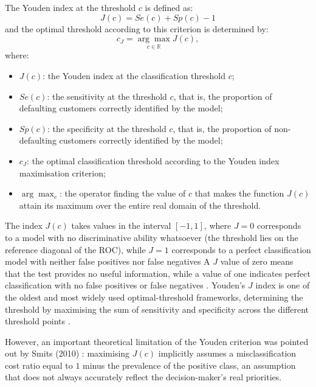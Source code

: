 \begin{enumerate}[label=\alph*)]
    \vspace{1em}
    \hspace{0.5cm} The Youden index at the threshold $c$ is defined as:
    \begin{equation}
        J(c) = Se(c) + Sp(c) - 1
    \end{equation}
    and the optimal threshold according to this criterion is determined by:
    \begin{equation}
        c_J = \underset{c \in \mathbb{R}}{\arg\max} J(c),
    \end{equation}
    where:
    \begin{itemize}
        \item $J(c)$: the Youden index at the classification threshold $c$;
        \item $Se(c)$: the sensitivity at the threshold $c$, that is, the proportion of defaulting customers correctly identified by the model;
        \item $Sp(c)$: the specificity at the threshold $c$, that is, the proportion of non-defaulting customers correctly identified by the model;
        \item $c_J$: the optimal classification threshold according to the Youden index maximisation criterion;
        \item $\arg\max_{c}$: the operator finding the value of $c$ that makes the function $J(c)$ attain its maximum over the entire real domain of the threshold.
    \end{itemize}
        \vspace{1em}
        \hspace{0.5cm} The index $J(c)$ takes values in the interval $[-1, 1]$, where $J = 0$ corresponds to a model with no discriminative ability whatsoever (the threshold lies on the reference diagonal of the ROC), while $J = 1$ corresponds to a perfect classification model with neither false positives nor false negatives A $J$ value of zero means that the test provides no useful information, while a value of one indicates perfect classification with no false positives or false negatives \cite{youden1950index}. Youden's $J$ index is one of the oldest and most widely used optimal-threshold frameworks, determining the threshold by maximising the sum of sensitivity and specificity across the different threshold points \cite{unal2017defining}.
        
        \hspace{0.5cm} However, an important theoretical limitation of the Youden criterion was pointed out by Smits (2010) \cite{smits2010note}: maximising $J(c)$ implicitly assumes a misclassification cost ratio equal to $1$ minus the prevalence of the positive class, an assumption that does not always accurately reflect the decision-maker's real priorities.


\end{enumerate}
